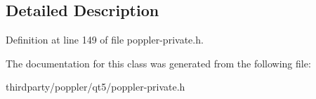\subsection{Detailed Description}


Definition at line 149 of file poppler-\/private.\+h.



The documentation for this class was generated from the following file\+:\begin{DoxyCompactItemize}
\item 
thirdparty/poppler/qt5/poppler-\/private.\+h\end{DoxyCompactItemize}
